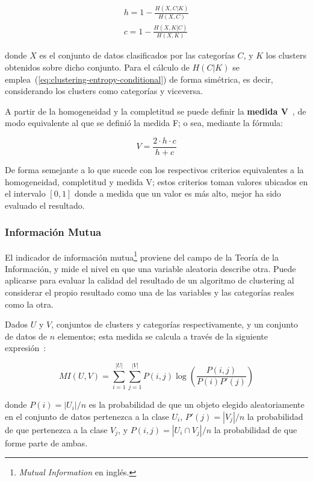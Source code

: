 \begin{gather}
    h = 1 - \frac{H(X, C|K)}{H(X, C)} \\
    c = 1 - \frac{H(X, K|C)}{H(X, K)}
\end{gather}

\noindent
donde $X$ es el conjunto de datos clasificados por las categorías $C$, y $K$ los clusters obtenidos sobre dicho conjunto.
Para el cálculo de $H(C|K)$ se emplea~(\ref{eq:clustering-entropy-conditional}) de forma simétrica, es decir, considerando los clusters como categorías y viceversa.

A partir de la homogeneidad y la completitud se puede definir la \textbf{medida V}~\cite{Rosenberg07}, de modo equivalente al que se definió la medida F;
o sea, mediante la fórmula:

\begin{equation}
    \label{eq:V-measure}
    V = \frac{2 \cdot h \cdot c}{h + c}
\end{equation}

De forma semejante a lo que sucede con los respectivos criterios equivalentes a la homogeneidad, completitud y medida V;
estos criterios toman valores ubicados en el intervalo $[0,1]$ donde a medida que un valor es más alto, mejor ha sido evaluado el resultado.

\subsubsection{Información Mutua}

El indicador de información mutua\footnote{\textit{Mutual Information} en inglés.} proviene del campo de la Teoría de la Información, y mide el nivel en que una variable aleatoria describe otra.
Puede aplicarse para evaluar la calidad del resultado de un algoritmo de clustering al considerar el propio resultado como una de las variables y las categorías reales como la otra.

Dados $U$ y $V$, conjuntos de clusters y categorías respectivamente, y un conjunto de datos de $n$ elementos;
esta medida se calcula a través de la siguiente expresión~\cite{Aggarawal13,Vinh10}:

\begin{equation}
    \label{eq:mutual-information}
    MI(U,V) = \sum_{i=1}^{|U|}\sum_{j=1}^{|V|}{P(i,j)\log{\left( \frac{P(i,j)}{P(i)P'(j)} \right)}}
\end{equation}

\noindent
donde $P(i) = |U_i|/n$ es la probabilidad de que un objeto elegido aleatoriamente en el conjunto de datos pertenezca a la clase $U_i$, $P'(j) = |V_j|/n$ la probabilidad de que pertenezca a la clase $V_j$, y $P(i,j) = |U_i \cap V_j|/n$ la probabilidad de que forme parte de ambas.

